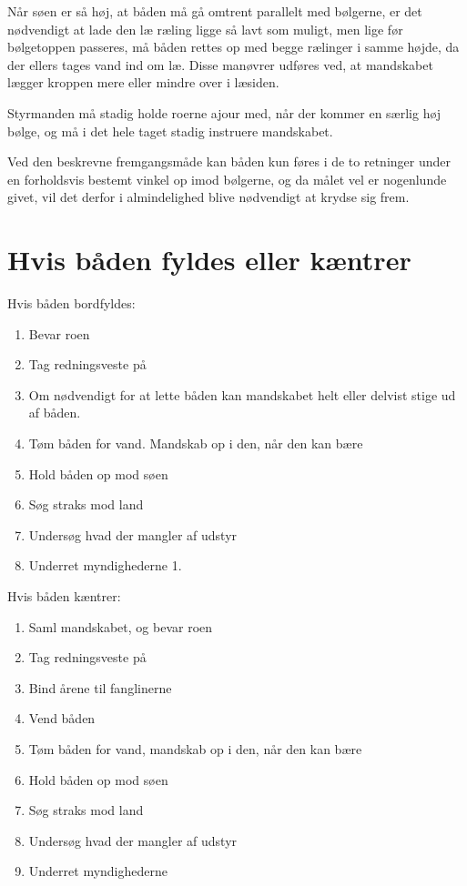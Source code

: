 \documentclass{article}
\begin{document}
Når søen er så høj, at båden må gå omtrent parallelt med bølgerne, er det
nødvendigt at lade den læ ræling ligge så lavt som muligt, men lige før
bølgetoppen passeres, må båden rettes op med begge rælinger i samme
højde, da der ellers tages vand ind om læ. Disse manøvrer udføres ved, at
mandskabet lægger kroppen mere eller mindre over i læsiden.

Styrmanden må stadig holde roerne ajour med, når der kommer en særlig høj
bølge, og må i det hele taget stadig instruere mandskabet.

Ved den beskrevne fremgangsmåde kan båden kun føres i de to retninger
under en forholdsvis bestemt vinkel op imod bølgerne, og da målet vel er
nogenlunde givet, vil det derfor i almindelighed blive nødvendigt at
krydse sig frem.

\section{Hvis båden fyldes eller kæntrer}

Hvis båden bordfyldes:

\begin{enumerate}
    \item Bevar roen
    \item Tag redningsveste på
    \item Om nødvendigt for at lette båden kan mandskabet helt eller
        delvist stige ud af båden.
    \item Tøm båden for vand. Mandskab op i den, når den kan bære
    \item Hold båden op mod søen
    \item Søg straks mod land
    \item Undersøg hvad der mangler af udstyr
    \item Underret myndighederne 1.
\end{enumerate}

Hvis båden kæntrer:

\begin{enumerate}
    \item Saml mandskabet, og bevar roen
    \item Tag redningsveste på
    \item Bind årene til fanglinerne
    \item Vend båden
    \item Tøm båden for vand, mandskab op i den, når den kan bære
    \item Hold båden op mod søen
    \item Søg straks mod land
    \item Undersøg hvad der mangler af udstyr
    \item Underret myndighederne
\end{enumerate}
\end{document}
